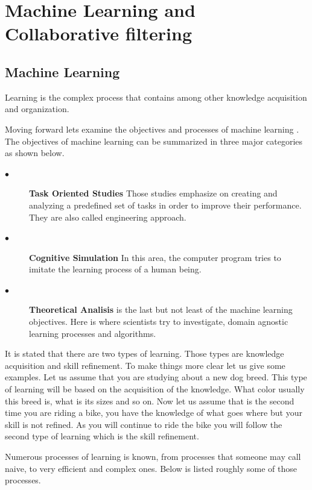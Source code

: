 \section{Machine Learning and Collaborative filtering}
\subsection{Machine Learning} Learning is the complex process that contains among other knowledge acquisition and organization.

Moving forward lets examine the objectives and processes of machine learning \cite{carbonell1983overview}. The objectives of machine learning can be summarized in three major categories as shown below.

\begin{description}
	\item[$\bullet$]{\bfseries Task Oriented Studies} Those studies emphasize on creating and analyzing a predefined set of tasks in order to improve their performance. They are also called engineering approach.
	\item[$\bullet$]{\bfseries Cognitive Simulation} In this area, the computer program tries to imitate the learning process of a human being.
	\item[$\bullet$] {\bfseries Theoretical Analisis} is the last but not least of the machine learning objectives. Here is where scientists try to investigate, domain agnostic learning processes and algorithms.
\end{description}

It is stated that there are two types of learning. Those types are knowledge acquisition and skill refinement. To make things more clear let us give some examples. Let us assume that you are studying about a new dog breed. This type of learning will be based on the acquisition of the knowledge. What color usually this breed is, what is its sizes and so on. Now let us assume that is the second time you are riding a bike, you have the knowledge of what goes where but your skill is not refined. As you will continue to ride the bike you will follow the second type of learning which is the skill refinement.

Numerous processes of learning is known, from processes that someone may call naive, to very efficient and complex ones. Below is listed roughly some of those processes.

